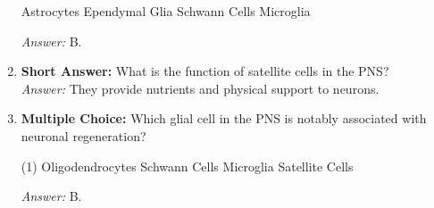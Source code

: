 \begin{enumerate}[label=\textbf{Q2.1.\arabic*}]
\begin{tasks}[label=(\Alph*), label-width=1.5em, item-indent=1.7em]
               \task Astrocytes
               \task Ependymal Glia
               \task Schwann Cells
               \task Microglia
          \end{tasks}
          \textit{Answer:} B.
    \item \textbf{Short Answer:} What is the function of satellite cells in the PNS? \\
          \textit{Answer:} They provide nutrients and physical support to neurons.
    \item \textbf{Multiple Choice:} Which glial cell in the PNS is notably associated with neuronal regeneration? 
          \begin{tasks}[label=(\Alph*), label-width=1.5em, item-indent=1.7em](1)
               \task Oligodendrocytes
               \task Schwann Cells
               \task Microglia
               \task Satellite Cells
          \end{tasks}
          \textit{Answer:} B.
\end{enumerate}
